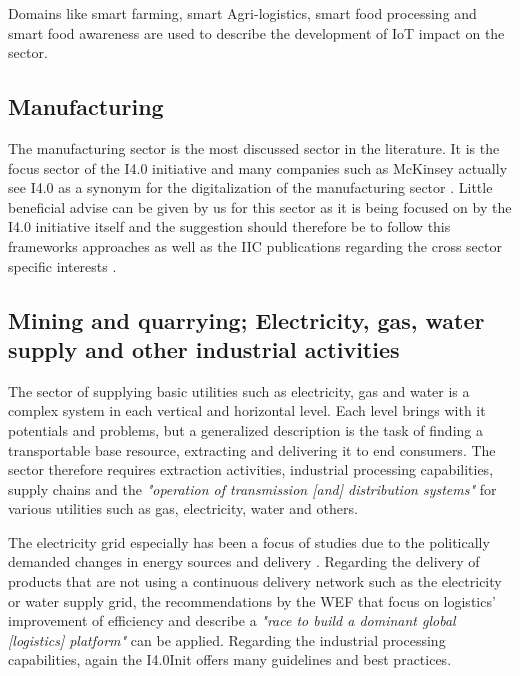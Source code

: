 
Domains like smart farming, smart Agri-logistics, smart food processing and smart food awareness are used to describe the development of \ac{IoT} impact on the sector.




\subsection{Manufacturing}
The manufacturing sector is the most discussed sector in the literature. It is the focus sector of the \ac{I4.0} initiative and many companies such as McKinsey actually see \ac{I4.0} as a synonym for the digitalization of the manufacturing sector \cite[]{McKinseydigitizationIndustrialSector:2015}. Little beneficial advise can be given by us for this sector as it is being focused on by the \ac{I4.0} initiative itself and the suggestion should therefore be to follow this frameworks approaches as well as the \ac{IIC} publications regarding the cross sector specific interests \cite[]{iicarchitecture:2016}.

\subsection{Mining and quarrying; Electricity, gas, water supply and other industrial activities }

The sector of supplying basic utilities such as electricity, gas and water is a complex system in each vertical and horizontal level. Each level brings with it potentials and problems, but a generalized description is the task of finding a transportable base resource, extracting and delivering it to end consumers. The sector therefore requires extraction activities, industrial processing capabilities, supply chains and the \emph{"operation of transmission [and] distribution systems"}\cite[p. 166ff.]{ISIC:2008} for various utilities such as gas, electricity, water and others.

The electricity grid especially has been a focus of studies due to the politically demanded changes in energy sources and delivery \cite[p.12ff.]{AppelrathKagermannMayer2012}. Regarding the delivery of products that are not using a continuous delivery network such as the electricity or water supply grid, the recommendations by the \ac{WEF} that focus on logistics' improvement of efficiency and describe a \emph{"race to build a dominant global [logistics] platform"}\cite{worldforumlogistics:2016} can be applied. Regarding the industrial processing capabilities, again the \acf{I4.0Init} offers many guidelines and best practices. 

